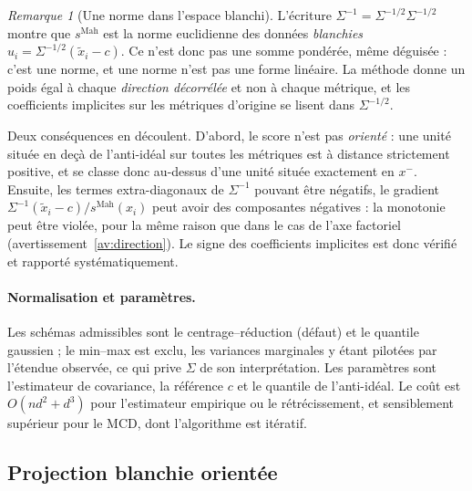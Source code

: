 \documentclass[11pt,a4paper]{article}
\theoremstyle{definition}
\theoremstyle{remark}
\newtheorem{remarque}{Remarque}[section]
\begin{document}
\medskip

\begin{remarque}[Une norme dans l'espace blanchi]
  \label{rem:maha-norme}
  L'écriture $\Sigma^{-1} = \Sigma^{-1/2}\Sigma^{-1/2}$ montre que $s^{\mathrm{Mah}}$ est
  la norme euclidienne des données \emph{blanchies}
  $u_i = \Sigma^{-1/2}(\tilde{x}_i - c)$. Ce n'est donc pas une somme pondérée, même
  déguisée : c'est une norme, et une norme n'est pas une forme linéaire. La méthode donne
  un poids égal à chaque \emph{direction décorrélée} et non à chaque métrique, et les
  coefficients implicites sur les métriques d'origine se lisent dans $\Sigma^{-1/2}$.

  \medskip

  Deux conséquences en découlent. D'abord, le score n'est pas \emph{orienté} : une unité
  située en deçà de l'anti-idéal sur toutes les métriques est à distance strictement
  positive, et se classe donc au-dessus d'une unité située exactement en $x^{-}$. Ensuite,
  les termes extra-diagonaux de $\Sigma^{-1}$ pouvant être négatifs, le gradient
  $\Sigma^{-1}(\tilde{x}_i - c)/s^{\mathrm{Mah}}(x_i)$ peut avoir des composantes
  négatives : la monotonie peut être violée, pour la même raison que dans le cas de l'axe
  factoriel (avertissement~\ref{av:direction}). Le signe des coefficients implicites est
  donc vérifié et rapporté systématiquement.
\end{remarque}

\bigskip

\paragraph{Normalisation et paramètres.} Les schémas admissibles sont le
centrage--réduction (défaut) et le quantile gaussien ; le min--max est exclu, les
variances marginales y étant pilotées par l'étendue observée, ce qui prive $\Sigma$ de son
interprétation. Les paramètres sont l'estimateur de covariance, la référence $c$ et le
quantile de l'anti-idéal. Le coût est $O(nd^2 + d^3)$ pour l'estimateur empirique ou le
rétrécissement, et sensiblement supérieur pour le MCD, dont l'algorithme est itératif.

\bigskip

\subsection{Projection blanchie orientée}
\label{sec:projection-blanchie}

\medskip
\end{document}
